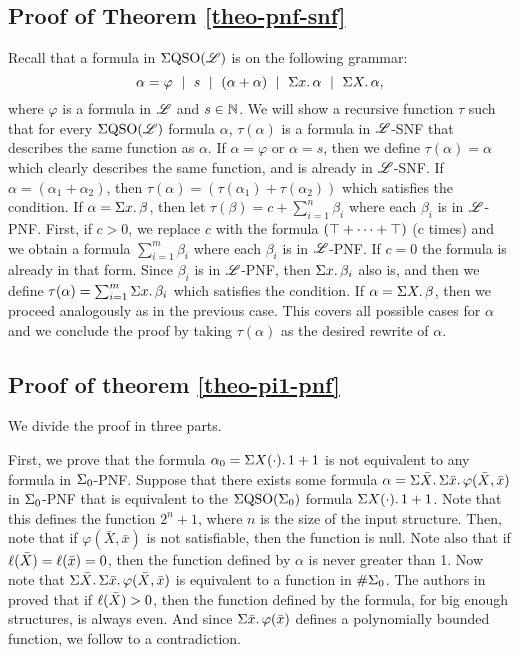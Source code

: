 \subsection*{Proof of Theorem \ref{theo-pnf-snf}}
Recall that a formula in $\Sigma{\rm QSO}(\mathscr{L})$ is on the following grammar:
$$
\alpha = \varphi \ \mid \ s \ \mid \ (\alpha + \alpha) \ \mid \ \sa{x} \alpha \ \mid \ \sa{X} \alpha,
$$
where $\varphi$ is a formula in $\mathscr{L}$ and $s\in\mathbb{N}$. We will show a recursive function $\tau$ such that for every $\Sigma{\rm QSO}(\mathscr{L})$ formula $\alpha$, $\tau(\alpha)$ is a formula in $\mathscr{L}$-SNF that describes the same function as $\alpha$. If $\alpha = \varphi$ or $\alpha = s$, then we define $\tau(\alpha) = \alpha$ which clearly describes the same function, and is already in $\mathscr{L}$-SNF. If $\alpha = (\alpha_1 + \alpha_2)$, then $\tau(\alpha) = (\tau(\alpha_1) + \tau(\alpha_2))$ which satisfies the condition. If $\alpha = \Sigma{x}.\,\beta$, then let $\tau(\beta) = c + \sum_{i = 1}^{n}\beta_i$ where each $\beta_i$ is in $\mathscr{L}$-PNF. First, if $c > 0$, we replace $c$ with the formula $(\top + \cdots + \top)$ (c times) and we obtain a formula $\sum_{i = 1}^{m}\beta_i$ where each $\beta_i$ is in $\mathscr{L}$-PNF. If $c = 0$ the formula is already in that form. Since $\beta_i$ is in $\mathscr{L}$-PNF, then $\Sigma{x}.\,\beta_i$ also is, and then we define $\tau(\alpha) = \sum_{i = 1}^{m}\Sigma{x}.\,\beta_i$ which satisfies the condition. If $\alpha = \Sigma{X}.\,\beta$, then we proceed analogously as in the previous case. This covers all possible cases for $\alpha$ and we conclude the proof by taking $\tau(\alpha)$ as the desired rewrite of $\alpha$.












\subsection*{Proof of theorem \ref{theo-pi1-pnf}}
We divide the proof in three parts.

\vspace{1em}
First, we prove that the formula $\alpha_{0} = \Sigma{X(\cdot)}.\,1 + 1$ is not equivalent to any formula in $\Sigma_{0}$-PNF. Suppose that there exists some formula $\alpha = \Sigma{\bar{X}}.\,\Sigma{\bar{x}}.\,\varphi(\bar{X},\bar{x})$ in $\Sigma_{0}$-PNF that is equivalent to the $\Sigma{\rm QSO}(\Sigma_{0})$ formula $\Sigma{X(\cdot)}.\,1 + 1$. Note that this defines the function $2^{n}+1$, where $n$ is the size of the input structure. Then, note that if $\varphi(\bar{X},\bar{x})$ is not satisfiable, then the function is null. Note also that if $\ell(\bar{X}) = \ell(\bar{x}) = 0$, then the function defined by $\alpha$ is never greater than 1. Now note that $\Sigma{\bar{X}}.\,\Sigma{\bar{x}}.\,\varphi(\bar{X},\bar{x})$ is equivalent to a function in $\#\Sigma_{0}$. The authors in \cite{SalujaST95} proved that if $\ell(\bar{X}) > 0$, then the function defined by the formula, for big enough structures, is always even. And since $\Sigma{\bar{x}}.\,\varphi(\bar{x})$ defines a polynomially bounded function, we follow to a contradiction.


